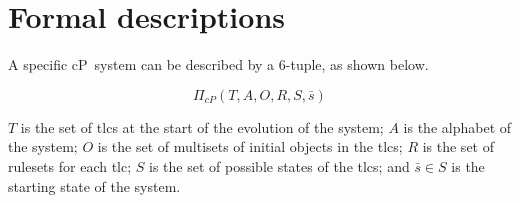 \section{\label{sec:cps:formaldescriptions}Formal  descriptions}

A specific cP~system can be described by a 6-tuple, as shown below.

\[
\Pi_{cP}(T, A, O, R, S, \bar{s})
\]

\(T\) is the set of \glspl{tlc} at the start of the evolution of the system; \(A\) is the alphabet of the system; \(O\) is the set of multisets of initial objects in the \glspl{tlc}; \(R\) is the set of rulesets for each \gls{tlc}; \(S\) is the set of possible states of the \glspl{tlc}; and \(\bar{s} \in S\) is the starting state of the system.